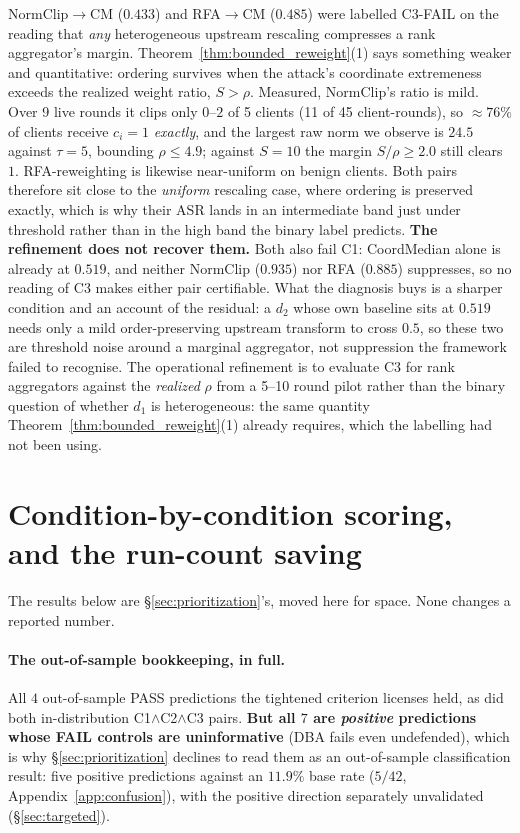 \documentclass{article}
\begin{document}
NormClip$\to$CM ($0.433$) and RFA$\to$CM ($0.485$) were labelled C3-FAIL on the reading that \emph{any} heterogeneous upstream rescaling compresses a rank aggregator's margin. Theorem~\ref{thm:bounded_reweight}(1) says something weaker and quantitative: ordering survives when the attack's coordinate extremeness exceeds the realized weight ratio, $S > \rho$. Measured, NormClip's ratio is mild. Over 9 live rounds it clips only $0$--$2$ of 5 clients (11 of 45 client-rounds), so ${\approx}76\%$ of clients receive $c_i = 1$ \emph{exactly}, and the largest raw norm we observe is $24.5$ against $\tau{=}5$, bounding $\rho \leq 4.9$; against $S{=}10$ the margin $S/\rho \geq 2.0$ still clears $1$. RFA-reweighting is likewise near-uniform on benign clients. Both pairs therefore sit close to the \emph{uniform} rescaling case, where ordering is preserved exactly, which is why their ASR lands in an intermediate band just under threshold rather than in the high band the binary label predicts. \textbf{The refinement does not recover them.} Both also fail C1: CoordMedian alone is already at $0.519$, and neither NormClip ($0.935$) nor RFA ($0.885$) suppresses, so no reading of C3 makes either pair certifiable. What the diagnosis buys is a sharper condition and an account of the residual: a $d_2$ whose own baseline sits at $0.519$ needs only a mild order-preserving upstream transform to cross $0.5$, so these two are threshold noise around a marginal aggregator, not suppression the framework failed to recognise. The operational refinement is to evaluate C3 for rank aggregators against the \emph{realized} $\rho$ from a 5--10 round pilot rather than the binary question of whether $d_1$ is heterogeneous: the same quantity Theorem~\ref{thm:bounded_reweight}(1) already requires, which the labelling had not been using.

\section{Condition-by-condition scoring, and the run-count saving}
\label{app:condition_scoring}

The results below are \S\ref{sec:prioritization}'s, moved here for space. None changes a reported number.

\paragraph{The out-of-sample bookkeeping, in full.} All $4$ out-of-sample PASS predictions the tightened criterion licenses held, as did both in-distribution C1$\wedge$C2$\wedge$C3 pairs. \textbf{But all $7$ are \emph{positive} predictions whose FAIL controls are uninformative} (DBA fails even undefended), which is why \S\ref{sec:prioritization} declines to read them as an out-of-sample classification result: five positive predictions against an $11.9\%$ base rate ($5/42$, Appendix~\ref{app:confusion}), with the positive direction separately unvalidated (\S\ref{sec:targeted}).
\end{document}
